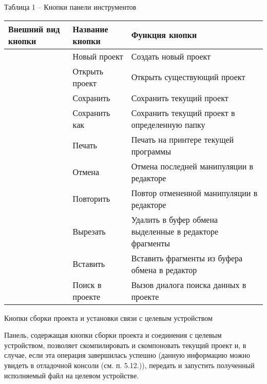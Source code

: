 \documentclass[letterpaper,10pt,russian]{sphinxmanual}
\begin{document}
Таблица 1 – Кнопки панели инструментов

\noindent\begin{tabulary}{\linewidth}{|L|L|L|}
\hline
\textsf{\relax 
Внешний вид кнопки
\unskip}\relax &\textsf{\relax 
Название кнопки
\unskip}\relax &\textsf{\relax 
Функция кнопки
\unskip}\relax \\
\hline
{}
&
Новый проект
&
Создать новый проект
\\
\hline
{}
&
Открыть проект
&
Открыть существующий
проект
\\
\hline
{}
&
Сохранить
&
Сохранить текущий
проект
\\
\hline
{}
&
Сохранить как
&
Сохранить текущий
проект в определенную
папку
\\
\hline
{}
&
Печать
&
Печать на принтере
текущей программы
\\
\hline
{}
&
Отмена
&
Отмена последней
манипуляции в
редакторе
\\
\hline
{}
&
Повторить
&
Повтор отмененной
манипуляции в
редакторе
\\
\hline
{}
&
Вырезать
&
Удалить в буфер
обмена выделенные в
редакторе фрагменты
\\
\hline
{}
&
Вставить
&
Вставить фрагменты из
буфера обмена в
редактор
\\
\hline
{}
&
Поиск в проекте
&
Вызов диалога поиска
данных в проекте
\\
\hline\end{tabulary}


Кнопки сборки проекта и установки связи с целевым устройством

Панель, содержащая кнопки сборки проекта и соединения с целевым
устройством, позволяет скомпилировать и скомпоновать текущий проект и, в
случае, если эта операция завершилась успешно (данную информацию можно
увидеть в отладочной консоли (см. п. 5.12.)), передать и запустить
полученный исполняемый файл на целевом устройстве.
\end{document}
